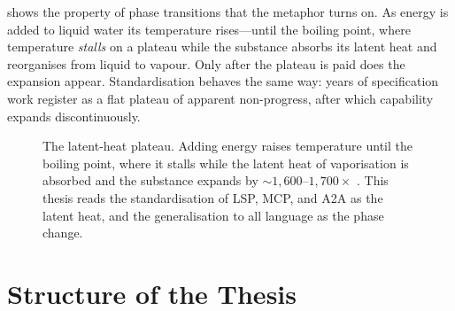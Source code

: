  shows the property of phase transitions that the metaphor
turns on. As energy is added to liquid water its temperature rises---until the
boiling point, where temperature \emph{stalls} on a plateau while the substance
absorbs its latent heat and reorganises from liquid to vapour. Only after the
plateau is paid does the expansion appear. Standardisation behaves the same way:
years of specification work register as a flat plateau of apparent
non-progress, after which capability expands discontinuously.

\begin{figure}[t]
\centering
{}
\caption[The latent-heat plateau of standardisation]{The latent-heat plateau.
Adding energy raises temperature until the boiling point, where it stalls while
the latent heat of vaporisation is absorbed and the substance expands by
${\sim}1{,}600$--$1{,}700\times$ \citep{nationalboard-steam,latentheat-openstax}.
This thesis reads the standardisation of LSP, MCP, and A2A as the latent heat,
and the generalisation to all language as the phase change.}
\label{fig:latent-heat}
\end{figure}

\section{Structure of the Thesis}
\label{sec:structure}

